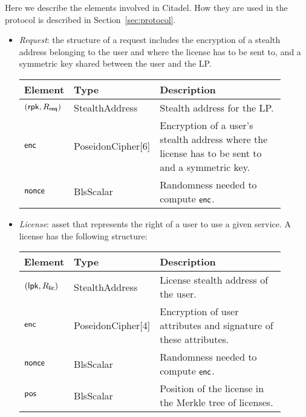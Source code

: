 

Here we describe the elements involved in Citadel. How they are used in the protocol is described in Section~\ref{sec:protocol}.

\begin{itemize}
	\itemsep1em 
	\item \emph{Request}: the structure of a request includes the encryption of a stealth address belonging to the user and where the license has to be sent to, and a symmetric key shared between the user and the LP.
	
	\vspace{0.1cm}
	\begin{center}
		\begin{tabular}{ | p{0.15\linewidth} | p{0.2\linewidth} | p{0.55\linewidth} | } 
		\hline
		{Element} & {Type} & {Description} \\
		\hline
		$(\mathsf{rpk}, R_{\mathsf{req}})$ & StealthAddress & Stealth address for the LP. \\
		$\mathsf{enc}$ & PoseidonCipher[6] & Encryption of a user's stealth address where the license has to be sent to and a symmetric key. \\
		$\mathsf{nonce}$ & BlsScalar & Randomness needed to compute $\mathsf{enc}$. \\ 
		\hline
		\end{tabular}
	\end{center}
	
	\item \emph{License}: asset that represents the right of a user to use a given service. A license has the following structure:
	
	\vspace{0.1cm}
    \begin{center}
		\begin{tabular}{ | p{0.15\linewidth} | p{0.2\linewidth} | p{0.55\linewidth} | } 
		\hline
			{Element} & {Type} & {Description} \\
		\hline
		$(\mathsf{lpk}, R_{\mathsf{lic}})$ & StealthAddress & License stealth address of the user. \\
		$\mathsf{enc}$ & PoseidonCipher[4] & Encryption of user attributes and signature of these attributes. \\
		$\mathsf{nonce}$ & BlsScalar & Randomness needed to compute $\mathsf{enc}$. \\ 
		$\mathsf{pos}$ & BlsScalar & Position of the license in the Merkle tree of licenses. \\ 
		\hline
		\end{tabular}
	\end{center}


\end{itemize}
